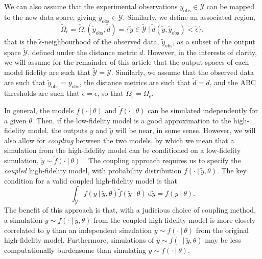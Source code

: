 \documentclass[12pt, onecolumn]{article}
\newcommand{\obs}[1]{#1_{\mathrm{obs}}}
\begin{document}
We can also assume that the experimental observations $\obs y \in \mathcal Y$ can be mapped to the new data space, giving $\obs{\tilde y} \in \tilde{\mathcal Y}$.
Similarly, we define an associated region,
\[
 \tilde \Omega_{\epsilon} = \tilde \Omega_{\epsilon} (\obs{\tilde y}, \tilde d) = \{ \tilde y \in \tilde{\mathcal Y} ~|~ \tilde d(\tilde y,\obs{\tilde y}) < \tilde \epsilon \},
\]
that is the $\tilde \epsilon$-neighbourhood of the observed data, $\obs{\tilde y}$, as a subset of the output space $\tilde{\mathcal Y}$, defined under the distance metric $\tilde d$.
However, in the interests of clarity, we will assume for the remainder of this article that the output spaces of each model fidelity are such that $\tilde{\mathcal Y} = \mathcal Y$.
Similarly, we assume that the observed data are such that $\obs{\tilde y} = \obs y$, the distance metrics are such that $\tilde d = d$, and the ABC thresholds are such that $\tilde \epsilon = \epsilon$, so that $\tilde \Omega_{\tilde \epsilon} = \Omega_\epsilon$.

In general, the models $f(\cdot~|~\theta)$ and $\tilde f(\cdot~|~\theta)$ can be simulated independently for a given $\theta$.
Then, if the low-fidelity model is a good approximation to the high-fidelity model, the outputs $y$ and $\tilde y$ will be near, in some sense.
However, we will also allow for \emph{coupling} between the two models, 
by which we mean that a simulation from the high-fidelity model can be conditioned on a low-fidelity simulation, $\tilde y \sim \tilde f(\cdot~|~\theta)$~\cite{Giles2008}.
The coupling approach requires us to specify the \emph{coupled} high-fidelity model, with probability distribution $f(\cdot~|~\tilde y, \theta)$.
The key condition for a valid coupled high-fidelity model is that
\begin{equation}
\label{eq:coupling}
 \int_{\tilde{\mathcal{Y}}} f(y ~|~ \tilde y, \theta) \tilde f(\tilde y~|~\theta) ~\mathrm d\tilde y = f(y ~|~ \theta).
\end{equation}
The benefit of this approach is that, with a judicious choice of coupling method, a simulation $y \sim f(\cdot~|~\tilde y, \theta)$ from the coupled high-fidelity model is more closely correlated to $\tilde y$ than an independent simulation $y \sim f(\cdot~|~\theta)$ from the original high-fidelity model.
Furthermore, simulations of $y \sim f(\cdot~|~\tilde y, \theta)$ may be less computationally burdensome than simulating $y \sim f(\cdot~|~\theta)$.
\end{document}
